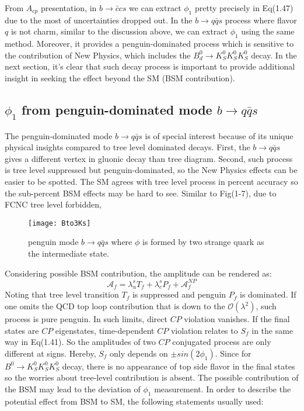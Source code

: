 From $A_{cp}$ presentation, in $b\to \bar{c}cs$ we can extract $\phi_1$ pretty precisely in Eq(1.47) due to the most of uncertainties dropped out.
In the $b\to q\bar{q}s$ process where flavor $q$ is not charm, similar to the discussion above, we can extract $\phi_1$ using the same method. Moreover, it provides a penguin-dominated process which is sensitive to the contribution of New Physics, which includes the $B^0_d\to K^0_S K^0_S K^0_S$ decay. In the next section, it's clear that such decay process is important to provide additional insight in seeking the effect beyond the SM (BSM contribution).


\subsection{$\phi_1$ from penguin-dominated mode $b\to q\bar{q}s$}
The penguin-dominated mode $b\to q\bar{q}s$ is of special interest because of its unique physical insights compared to tree level dominated decays. 
First,  the $b\to q\bar{q}s$  gives a different vertex in gluonic decay than tree diagram. 
Second, such process is tree level suppressed but penguin-dominated, so the New Physics effects can be easier to be spotted. The SM agrees with tree level process in percent accuracy so the sub-percent BSM effects may be hard to see. Similar to Fig(1-7), due to FCNC tree level forbidden, 
\begin{figure}[H]
	\centering
	\texttt{[image: Bto3Ks]}
	\caption{penguin mode $b\to q\bar{q}s$ where $\phi$ is formed by two strange quark as the intermediate state.}
\end{figure}

Considering possible BSM contribution, the amplitude can be rendered as: 
\begin{equation}
\mathcal{A}_f= 
\lambda^s_u T_f + 
\lambda^s_c P_f +
\mathcal{A}_f^{NP} 
\end{equation}
Noting that tree level transition $T_f$ is suppressed and penguin $P_f$ is dominated. If one omits the QCD top loop contribution that is down to the $\mathcal{O}(\lambda^2)$, such process is pure penguin. In such limits, direct $CP$ violation vanishes. If the final states are $CP$ eigenstates, time-dependent $CP$ violation relates to $S_f$ in the same way in Eq(1.41). So the amplitudes of two $CP$ conjugated process are only different at signs. Hereby, $S_f$ only depends on $\pm sin(2\phi_1)$. Since for $B^0 \to K_S^0  K_S^0  K_S^0$ decay, there is no appearance of top side flavor in the final states so the worries about tree-level contribution is absent. The possible contribution of the BSM may lead to the deviation of $\phi_1$ measurement. In order to describe the potential effect from BSM to SM, the following statements usually used\cite{b2book}:

